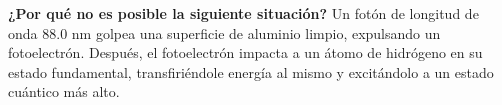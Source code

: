 \item \textbf{¿Por qué no es posible la siguiente situación?}
Un fotón de longitud de onda $88.0\text{ nm}$ golpea una superficie de aluminio limpio, expulsando un fotoelectrón. Después, el fotoelectrón impacta a un átomo de hidrógeno en su estado fundamental, transfiriéndole energía al mismo y excitándolo a un estado cuántico más alto.